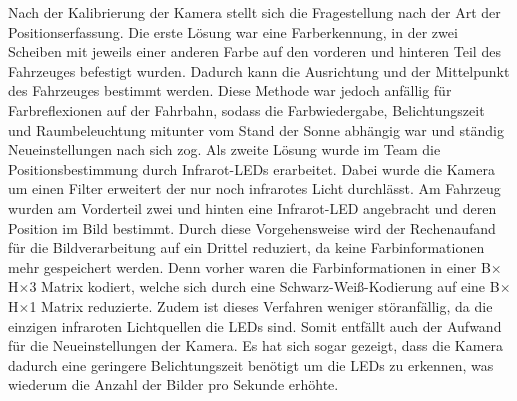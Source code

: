 Nach der Kalibrierung der Kamera stellt sich die Fragestellung nach der Art der Positionserfassung. Die erste Lösung war eine Farberkennung, in der zwei Scheiben mit jeweils einer anderen Farbe auf den vorderen und hinteren Teil des Fahrzeuges befestigt wurden. Dadurch kann die Ausrichtung und der Mittelpunkt des Fahrzeuges bestimmt werden. Diese Methode war jedoch anfällig für Farbreflexionen auf der Fahrbahn, sodass die Farbwiedergabe, Belichtungszeit und Raumbeleuchtung mitunter vom Stand der Sonne abhängig war und ständig Neueinstellungen nach sich zog. Als zweite Lösung wurde im Team die Positionsbestimmung durch Infrarot-LEDs erarbeitet. Dabei wurde die Kamera um einen Filter erweitert der nur noch infrarotes Licht durchlässt. Am Fahrzeug wurden am Vorderteil zwei und hinten eine Infrarot-LED angebracht und deren Position im Bild bestimmt. Durch diese Vorgehensweise wird der Rechenaufand für die Bildverarbeitung auf ein Drittel reduziert, da keine Farbinformationen mehr gespeichert werden. Denn vorher waren die Farbinformationen in einer B$\times$H$\times$3 Matrix kodiert, welche sich durch eine Schwarz-Weiß-Kodierung auf eine B$\times$H$\times$1 Matrix reduzierte. Zudem ist dieses Verfahren weniger störanfällig, da die einzigen infraroten Lichtquellen die LEDs sind. Somit entfällt auch der Aufwand für die Neueinstellungen der Kamera. Es hat sich sogar gezeigt, dass die Kamera dadurch eine geringere Belichtungszeit benötigt um die LEDs zu erkennen, was wiederum die Anzahl der Bilder pro Sekunde erhöhte.   
